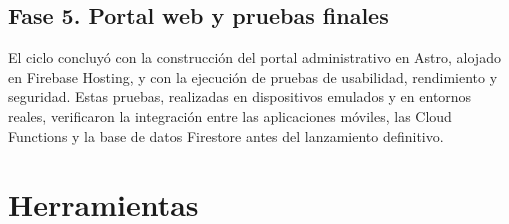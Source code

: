 \begin{large}
\subsection*{Fase 5. Portal web y pruebas finales}
El ciclo concluyó con la construcción del portal administrativo en Astro, alojado en Firebase Hosting, y con la ejecución de pruebas de usabilidad, rendimiento y seguridad. Estas pruebas, realizadas en dispositivos emulados y en entornos reales, verificaron la integración entre las aplicaciones móviles, las Cloud Functions y la base de datos Firestore antes del lanzamiento definitivo.
\end{large}

\section{Herramientas}
